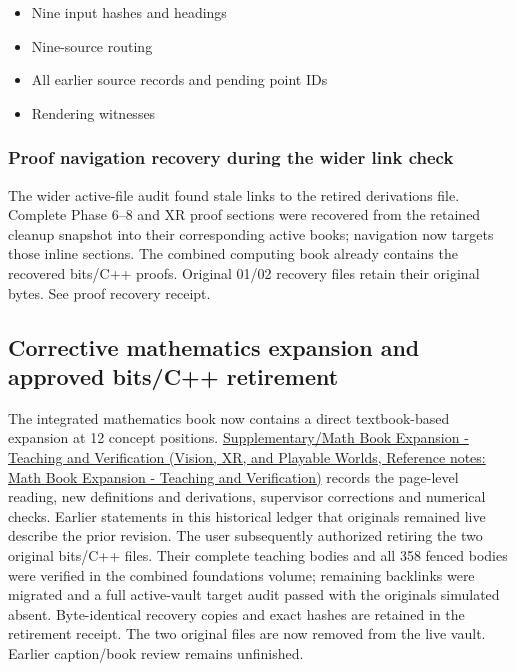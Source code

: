 \begin{itemize}
\tightlist
\item
  {Nine input hashes and headings}
\item
  {Nine-source routing}
\item
  {All earlier source records and pending point IDs}
\item
  {Rendering witnesses}
\end{itemize}

\subsubsection{Proof navigation recovery during the wider link check}\label{appendix-3b67654799a2-proof-navigation-recovery-during-the-wider-link-check}

The wider active-file audit found stale links to the retired derivations file. Complete Phase 6--8 and XR proof sections were recovered from the retained cleanup snapshot into their corresponding active books; navigation now targets those inline sections. The combined computing book already contains the recovered bits/C++ proofs. Original 01/02 recovery files retain their original bytes. See {proof recovery receipt}.

\subsection{Corrective mathematics expansion and approved bits/C++ retirement}\label{appendix-3b67654799a2-corrective-mathematics-expansion-and-approved-bitsc-retirement}

The integrated mathematics book now contains a direct textbook-based expansion at 12 concept positions. \href{../07-Vision-XR-and-Playable-Worlds/main.pdf\#nameddest=appendix-5056f3debc1f}{Supplementary/Math Book Expansion - Teaching and Verification (Vision, XR, and Playable Worlds, Reference notes: Math Book Expansion - Teaching and Verification)} records the page-level reading, new definitions and derivations, supervisor corrections and numerical checks. Earlier statements in this historical ledger that originals remained live describe the prior revision. The user subsequently authorized retiring the two original bits/C++ files. Their complete teaching bodies and all 358 fenced bodies were verified in the combined foundations volume; remaining backlinks were migrated and a full active-vault target audit passed with the originals simulated absent. Byte-identical recovery copies and exact hashes are retained in the {retirement receipt}. The two original files are now removed from the live vault. Earlier caption/book review remains unfinished.

